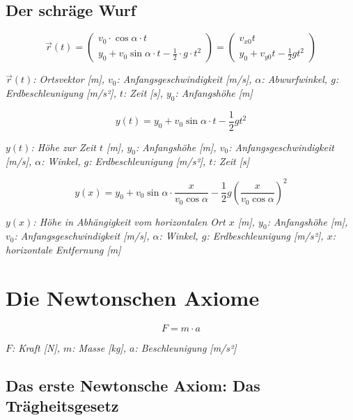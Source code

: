 \documentclass[a4paper,10pt]{article}
\newenvironment{displayformula}
{
	\begin{framed}
		\color{formulaColor}
	}
	{\end{framed}}
\newcommand{\formulalegend}[1]{%
	\par\vspace{0.5ex}%
	{{\color{legendColor}\RaggedRight\small\textit{#1}}}%
	\par\vspace{1.5ex}%
}
\begin{document}
\subsection{Der schräge Wurf}

\begin{displayformula}
	\[
	\vec{r}(t) =
	\begin{pmatrix}
		v_0 \cdot \cos\alpha \cdot t\\
		y_0 + v_0\sin\alpha \cdot t - \frac{1}{2} \cdot g \cdot t^2
	\end{pmatrix}
	=
	\begin{pmatrix}
		v_{x0} t\\
		y_0 + v_{y0} t - \frac{1}{2} g t^2
	\end{pmatrix}
	\]
\end{displayformula}
\formulalegend{
	\( \vec{r}(t) \): Ortsvektor [m], \( v_0 \): Anfangsgeschwindigkeit [m/s], \( \alpha \): Abwurfwinkel, \( g \): Erdbeschleunigung [m/s²], \( t \): Zeit [s], \( y_0 \): Anfangshöhe [m]
}

\begin{displayformula}
	\[
	y(t) = y_0 + v_0\sin\alpha \cdot t - \frac{1}{2} gt^2
	\]
\end{displayformula}
\formulalegend{
	\( y(t) \): Höhe zur Zeit \( t \) [m], \( y_0 \): Anfangshöhe [m], \( v_0 \): Anfangsgeschwindigkeit [m/s], \( \alpha \): Winkel, \( g \): Erdbeschleunigung [m/s²], \( t \): Zeit [s]
}

\begin{displayformula}
	\[
	y(x) = y_0 + v_0\sin\alpha \cdot \frac{x}{v_0 \cos\alpha} - \frac{1}{2} g \left(\frac{x}{v_0\cos\alpha}\right)^2
	\]
\end{displayformula}
\formulalegend{
	\( y(x) \): Höhe in Abhängigkeit vom horizontalen Ort \( x \) [m], \( y_0 \): Anfangshöhe [m], \( v_0 \): Anfangsgeschwindigkeit [m/s], \( \alpha \): Winkel, \( g \): Erdbeschleunigung [m/s²], \( x \): horizontale Entfernung [m]
}



\section{Die Newtonschen Axiome}

\begin{displayformula}
	\[
	F = m \cdot a
	\]
\end{displayformula}
\formulalegend{
	\( F \): Kraft [N], \( m \): Masse [kg], \( a \): Beschleunigung [m/s²]
}

\subsection{Das erste Newtonsche Axiom: Das Trägheitsgesetz}
\end{document}
